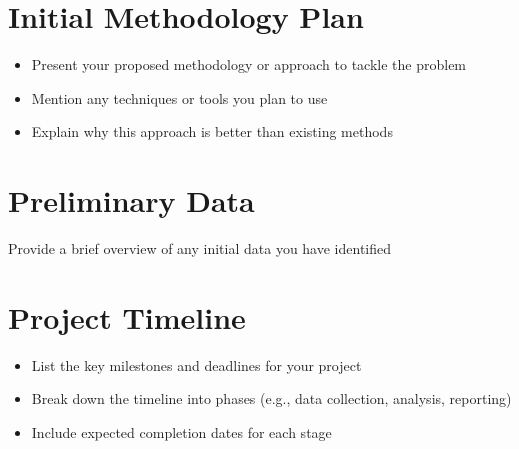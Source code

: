 \documentclass{article}
\begin{document}
\section*{Initial Methodology Plan}
\begin{itemize}
    \item Present your proposed methodology or approach to tackle the problem
    \item Mention any techniques or tools you plan to use
    \item Explain why this approach is better than existing methods
\end{itemize}


\section*{Preliminary Data}
Provide a brief overview of any initial data you have identified


\section*{Project Timeline}
\begin{itemize}
    \item List the key milestones and deadlines for your project
    \item Break down the timeline into phases (e.g., data collection, analysis, reporting)
    \item Include expected completion dates for each stage
\end{itemize}




\end{document}
